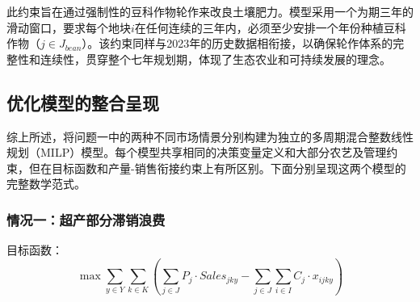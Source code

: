 \documentclass[withoutpreface,bwprint]{cumcmthesis} %
\begin{document}
此约束旨在通过强制性的豆科作物轮作来改良土壤肥力。模型采用一个为期三年的滑动窗口，要求每个地块$i$在任何连续的三年内，必须至少安排一个年份种植豆科作物（$j \in J_{bean}$）。该约束同样与2023年的历史数据相衔接，以确保轮作体系的完整性和连续性，贯穿整个七年规划期，体现了生态农业和可持续发展的理念。

\subsection{优化模型的整合呈现}

综上所述，将问题一中的两种不同市场情景分别构建为独立的多周期混合整数线性规划（MILP）模型。每个模型共享相同的决策变量定义和大部分农艺及管理约束，但在目标函数和产量-销售衔接约束上有所区别。下面分别呈现这两个模型的完整数学范式。

\subsubsection{情况一：超产部分滞销浪费}

目标函数：
\begin{equation}
	\max \sum_{y \in Y} \sum_{k \in K} \left( \sum_{j \in J} P_j \cdot Sales_{jky} - \sum_{j \in J} \sum_{i \in I} C_j \cdot x_{ijky} \right)
\end{equation}
\end{document}
